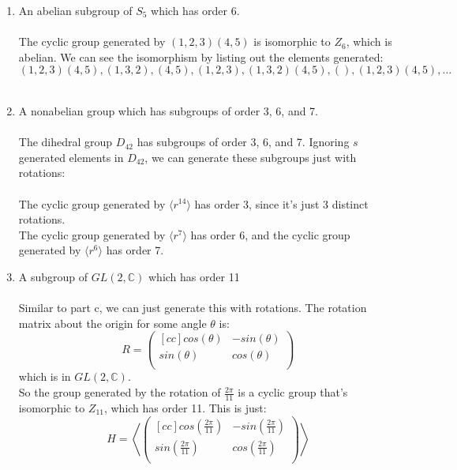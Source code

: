 \begin{enumerate}
\begin{enumerate}
            \item An abelian subgroup of $S_5$ which has order 6.\\\\

            The cyclic group generated by $(1,2,3)(4,5)$ is isomorphic to $Z_6$, which is abelian. We can see the isomorphism by listing out the elements generated:\\
            $$(1,2,3)(4,5) , (1,3,2), (4,5), (1,2,3), (1,3,2)(4,5) , (), (1,2,3)(4,5), \ldots $$\\

            \item A nonabelian group which has subgroups of order 3, 6, and 7.\\\\

            The dihedral group $D_{42}$ has subgroups of order 3, 6, and 7. Ignoring $s$ generated elements in $D_{42}$, we can generate these subgroups just with rotations:\\\\
            The cyclic group generated by $\langle r^{14} \rangle$ has order 3, since it's just 3 distinct rotations.\\
            The cyclic group generated by $\langle r^7 \rangle$ has order 6, and the cyclic group generated by $\langle r^6 \rangle$ has order 7.\\

            \item A subgroup of $GL(2,\mathds{C})$ which has order 11\\\\

            Similar to part c, we can just generate this with rotations. The rotation matrix about the origin for some angle $\theta$ is:
            $$
            R = 
            \begin{pmatrix}[cc]
              cos(\theta) & -sin(\theta)\\
              sin(\theta) & cos(\theta)\\              
            \end{pmatrix}
            $$
            which is in $GL(2,\mathds{C})$.\\
            
            So the group generated by the rotation of $\frac{2\pi}{11}$ is a cyclic group that's isomorphic to $Z_{11}$, which has order 11. This is just:
            $$
            H = 
            \left \langle
            \begin{pmatrix}[cc]
              cos(\frac{2\pi}{11}) & -sin(\frac{2\pi}{11})\\
              sin(\frac{2\pi}{11}) & cos(\frac{2\pi}{11})\\              
            \end{pmatrix}
            \right \rangle
            $$
            

            \end{enumerate}
\end{enumerate}       

